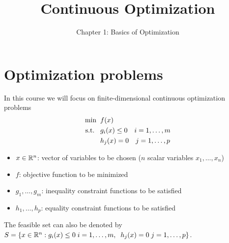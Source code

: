 \documentclass[10pt,a4paper]{article}
\title{Continuous Optimization}
\author{Chapter 1: Basics of Optimization}
\date{}
\begin{document}
	\maketitle
	\section{Optimization problems}
	In this course we will focus on finite-dimensional continuous optimization problems
	\begin{equation}\label{eq:problem}
	\begin{split}
		\min \;\; &f(x)\\
		\text{s.t.} \;\;\;&g_i(x) \leq 0 \quad i=1, \dots, m\\
		& h_j(x) = 0 \quad j=1, \dots, p
	\end{split}
	\end{equation}
\begin{itemize}
	\item $x \in \mathbb{R}^n$: vector of variables to be chosen ($n$ scalar variables $x_1 , \dots , x_n$)
	\item $f$: objective function to be minimized
	\item $g_1,\dots, g_m$: inequality constraint functions to be satisfied
	\item $h_1,\dots, h_p$: equality constraint functions to be satisfied
\end{itemize}
The feasible set can also be denoted by $S=\{x \in \mathbb{R}^n: g_i(x) \leq 0 \; i=1, \dots, m, \;\; h_j(x) = 0 \; j=1, \dots, p\}$.
\end{document}
